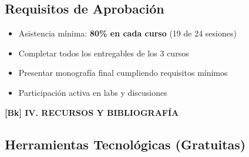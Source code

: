 \documentclass[12pt,a4paper]{yaac-luatex}
\newcommand{\faBook}{[Bk]}
\newcommand{\secciontitulo}[1]{
	\vspace{0.5cm}
	\begin{tcolorbox}[
		enhanced,
		colback=maincolor,
		colframe=maincolor,
		arc=3pt,
		boxrule=0pt,
		left=8pt,
		right=8pt,
		top=6pt,
		bottom=6pt
		]
		{\color{white}\large\bfseries #1}
	\end{tcolorbox}
}
\begin{document}
	\subsection*{Requisitos de Aprobación}
	
	\begin{itemize}[leftmargin=*, itemsep=0.2cm]
		\item Asistencia mínima: \textbf{80\% en cada curso} (19 de 24 sesiones)
		\item Completar todos los entregables de los 3 cursos
		\item Presentar monografía final cumpliendo requisitos mínimos
		\item Participación activa en labs y discusiones
	\end{itemize}
	
	\newpage
	
	\secciontitulo{\faBook \hspace{0.3em} IV. RECURSOS Y BIBLIOGRAFÍA}
	
	\subsection*{Herramientas Tecnológicas (Gratuitas)}
	
\end{document}
